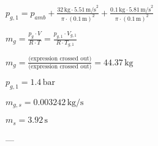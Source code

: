 \( p_{g,1} = p_{amb} + \frac{32 \, \text{kg} \cdot 5.51 \, \text{m/s}^2}{\pi \cdot (0.1 \, \text{m})^2} + \frac{0.1 \, \text{kg} \cdot 5.81 \, \text{m/s}^2}{\pi \cdot (0.1 \, \text{m})^2} \)  

\( m_g = \frac{p_g \cdot V}{R \cdot T} = \frac{p_{g,1} \cdot V_{g,1}}{R \cdot T_{g,1}} \)  

\( m_g = \frac{\text{(expression crossed out)}}{\text{(expression crossed out)}} = 44.37 \, \text{kg} \)  

\( p_{g,1} = 1.4 \, \text{bar} \)  

\( m_{g,s} = 0.003242 \, \text{kg/s} \)  

\( m_s = 3.92 \, \text{s} \)  

---